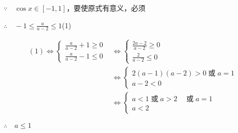 \begin{solution}
$\because\quad \cos x\in[-1,1]$，要使原式有意义，必须

$\therefore\quad -1\le \frac{a}{a-2}\le 1$\hfill(1)

\[\begin{split}
(1)\Longleftrightarrow \begin{cases}
    \frac{a}{a-2}+1\ge 0\\
    \frac{a}{a-2}-1\le 0
\end{cases}&\Longleftrightarrow \begin{cases}
    \frac{2a-2}{a-2}\ge 0\\ 
    \frac{2}{a-2}\le 0
\end{cases}\\
&\Longleftrightarrow \begin{cases}
   2(a-1)(a-2)>0\;\text{或}\; a=1\\ 
    {a-2}< 0
\end{cases}\\
&\Longleftrightarrow \begin{cases}
    a<1\; \text{或}\; a>2\quad \;{或}\; a=1\\ 
    a<2
\end{cases}
\end{split}\]

$\therefore\quad a\le 1$
\end{solution}

